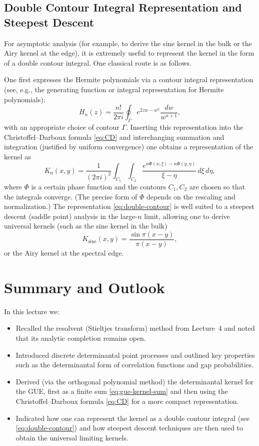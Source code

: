 \documentclass[letterpaper,11pt,oneside,reqno]{article}
\numberwithin{equation}{section}
\theoremstyle{definition}
\begin{document}
\subsection{Double Contour Integral Representation and Steepest Descent}
For asymptotic analysis (for example, to derive the sine kernel in the bulk or the Airy kernel at the edge), it is extremely useful to represent the kernel in the form of a double contour integral. One classical route is as follows.

One first expresses the Hermite polynomials via a contour integral representation (see, e.g., the generating function or integral representation for Hermite polynomials):
\[
H_n(z)=\frac{n!}{2\pi i}\oint_\Gamma e^{2zw-w^2}\frac{dw}{w^{n+1}},
\]
with an appropriate choice of contour $\Gamma$. Inserting this representation into the Christoffel--Darboux formula \eqref{eq:CD} and interchanging summation and integration (justified by uniform convergence) one obtains a representation of the kernel as
\begin{equation}
\label{eq:double-contour}
K_n(x,y)=\frac{1}{(2\pi i)^2}\int_{C_1}\int_{C_2} \frac{e^{n\Phi(x,\xi)-n\Phi(y,\eta)}}{\xi-\eta}\,d\xi\,d\eta,
\end{equation}
where $\Phi$ is a certain phase function and the contours $C_1,C_2$ are chosen so that the integrals converge. (The precise form of $\Phi$ depends on the rescaling and normalization.) The representation \eqref{eq:double-contour} is well suited to a steepest descent (saddle point) analysis in the large-$n$ limit, allowing one to derive universal kernels (such as the sine kernel in the bulk)
\[
K_{\mathrm{sine}}(x,y)=\frac{\sin\pi(x-y)}{\pi(x-y)},
\]
or the Airy kernel at the spectral edge.

\section{Summary and Outlook}
In this lecture we:
\begin{itemize}
  \item Recalled the resolvent (Stieltjes transform) method from Lecture~4 and noted that its analytic completion remains open.
  \item Introduced discrete determinantal point processes and outlined key properties such as the determinantal form of correlation functions and gap probabilities.
  \item Derived (via the orthogonal polynomial method) the determinantal kernel for the GUE, first as a finite sum \eqref{eq:gue-kernel-sum} and then using the Christoffel--Darboux formula \eqref{eq:CD} for a more compact representation.
  \item Indicated how one can represent the kernel as a double contour integral (see \eqref{eq:double-contour}) and how steepest descent techniques are then used to obtain the universal limiting kernels.
\end{itemize}
\end{document}
